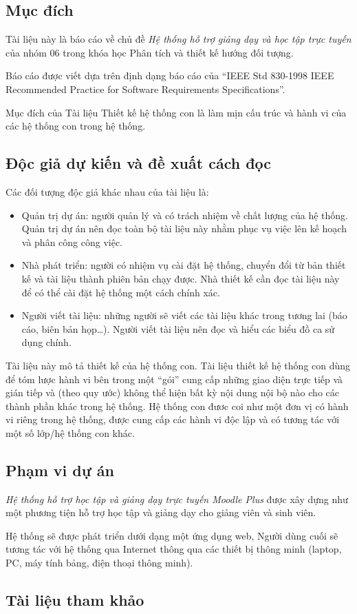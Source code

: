 \documentclass[./../main.tex]{subfiles}
\begin{document}
\subsection{Mục đích}
Tài liệu này là báo cáo về chủ đề \textit{Hệ thống hỗ trợ giảng dạy và học tập trực tuyến} của nhóm 06 trong khóa học Phân tích và thiết kế hướng đối tượng.

Báo cáo được viết dựa trên định dạng báo cáo của “IEEE Std 830-1998 IEEE Recommended Practice for Software Requirements Specifications”.

Mục đích của Tài liệu Thiết kế hệ thống con là làm mịn cấu trúc và hành vi của các hệ thống con trong hệ thống.

\subsection{Độc giả dự kiến và đề xuất cách đọc}

Các đối tượng độc giả khác nhau của tài liệu là:
\begin{itemize}
    \item Quản trị dự án: người quản lý và có trách nhiệm về chất lượng của hệ thống. Quản trị dự án nên đọc toàn bộ tài liệu này nhằm phục vụ việc lên kế hoạch và phân công công việc.
    \item Nhà phát triển: người có nhiệm vụ cài đặt hệ thống, chuyển đổi từ bản thiết kế và tài liệu thành phiên bản chạy được. Nhà thiết kế cần đọc tài liệu này để có thể cài đặt hệ thống một cách chính xác.
    \item Người viết tài liệu: những người sẽ viết các tài liệu khác trong tương lai (báo cáo, biên bản họp…). Người viết tài liệu nên đọc và hiểu các biểu đồ ca sử dụng chính.
\end{itemize}

Tài liệu này mô tả thiết kế của hệ thống con. Tài liệu thiết kế hệ thống con dùng để tóm lược hành vi bên trong một “gói” cung cấp những giao diện trực tiếp và gián tiếp và (theo quy ước) không thể hiện bất kỳ nội dung nội bộ nào cho các thành phần khác trong hệ thống. Hệ thống con đươc coi như một đơn vị có hành vi riêng trong hệ thống, được cung cấp các hành vi độc lập và có tương tác với một số lớp/hệ thống con khác.

\subsection{Phạm vi dự án}
\textit{Hệ thống hỗ trợ học tập và giảng dạy trực tuyến Moodle Plus} được xây dựng như một phương tiện hỗ trợ học tập và giảng dạy cho giảng viên và sinh viên.

Hệ thống sẽ được phát triển dưới dạng một ứng dụng web, Người dùng cuối sẽ tương tác với hệ thống qua Internet thông qua các thiết bị thông minh (laptop, PC, máy tính bảng, điện thoại thông minh).

\subsection{Tài liệu tham khảo}
\nocite{*}
\printbibliography
\end{document}
